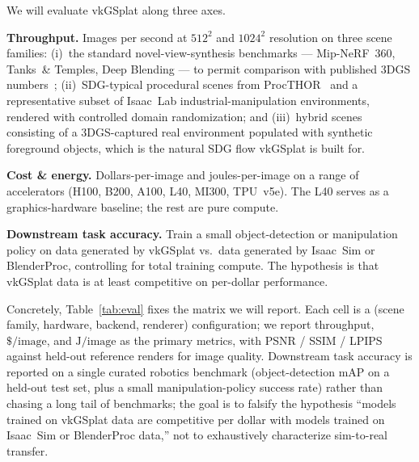\documentclass[10pt,journal]{IEEEtran}
\begin{document}
We will evaluate vkGSplat along three axes.

\textbf{Throughput.} Images per second at $512^2$ and $1024^2$
resolution on three scene families:
(i)~the standard novel-view-synthesis benchmarks --- Mip-NeRF~360,
Tanks~\& Temples, Deep Blending --- to permit comparison with
published 3DGS numbers~\cite{kerbl20233dgs};
(ii)~SDG-typical procedural scenes from ProcTHOR~\cite{deitke2022procthor}
and a representative subset of Isaac~Lab industrial-manipulation
environments, rendered with controlled domain randomization;
and (iii)~hybrid scenes consisting of a 3DGS-captured real environment
populated with synthetic foreground objects, which is the natural SDG
flow vkGSplat is built for.

\textbf{Cost \& energy.} Dollars-per-image and joules-per-image on a
range of accelerators (H100, B200, A100, L40, MI300, TPU~v5e). The L40
serves as a graphics-hardware baseline; the rest are pure compute.

\textbf{Downstream task accuracy.} Train a small object-detection or
manipulation policy on data generated by vkGSplat vs.\ data generated by
Isaac~Sim or BlenderProc, controlling for total training compute. The
hypothesis is that vkGSplat data is at least competitive on per-dollar
performance.

Concretely, Table~\ref{tab:eval} fixes the matrix we will report.
Each cell is a (scene family, hardware, backend, renderer)
configuration; we report throughput, $\$\slash\textrm{image}$, and
$\textrm{J}\slash\textrm{image}$ as the primary metrics, with PSNR /
SSIM / LPIPS against held-out reference renders for image quality.
Downstream task accuracy is reported on a single curated robotics
benchmark (object-detection mAP on a held-out test set, plus a small
manipulation-policy success rate) rather than chasing a long tail of
benchmarks; the goal is to falsify the hypothesis ``models trained on
vkGSplat data are competitive per dollar with models trained on
Isaac~Sim or BlenderProc data,'' not to exhaustively characterize
sim-to-real transfer.
\end{document}
